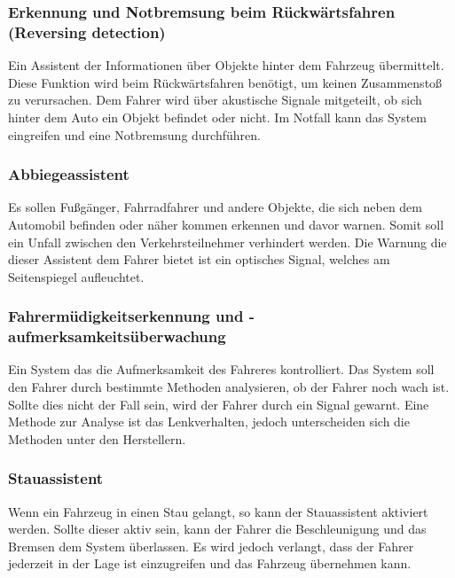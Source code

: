         \subsubsection{Erkennung und Notbremsung beim Rückwärtsfahren (Reversing detection)}
        Ein Assistent der Informationen über Objekte hinter dem Fahrzeug übermittelt. Diese Funktion
        wird beim Rückwärtsfahren benötigt, um keinen Zusammenstoß zu verursachen. Dem Fahrer wird 
        über akustische Signale mitgeteilt, ob sich hinter dem Auto ein Objekt befindet oder nicht.
        Im Notfall kann das System eingreifen und eine Notbremsung durchführen.
        ~\cite{assistenzsysteme.PB2}  ~\cite{reversedetection.PB1}

        \subsubsection{Abbiegeassistent}
        Es sollen Fußgänger, Fahrradfahrer und andere Objekte, die sich neben dem Automobil befinden
        oder näher kommen erkennen und davor warnen. Somit soll ein Unfall zwischen den Verkehrsteilnehmer
        verhindert werden. Die Warnung die dieser Assistent dem Fahrer bietet ist ein optisches Signal,
        welches am Seitenspiegel aufleuchtet.
        ~\cite{assistenzsysteme.PB2} ~\cite{abbiegeassi.PB1} ~\cite{abbiegeassi.PB2}

        \subsubsection{Fahrermüdigkeitserkennung und -aufmerksamkeitsüberwachung}
        Ein System das die Aufmerksamkeit des Fahreres kontrolliert. Das System soll den Fahrer durch
        bestimmte Methoden analysieren, ob der Fahrer noch wach ist. Sollte dies nicht der Fall sein,
        wird der Fahrer durch ein Signal gewarnt. Eine Methode zur Analyse ist das Lenkverhalten, jedoch
        unterscheiden sich die Methoden unter den Herstellern.
        ~\cite{muedigkeitsassi.PB1} ~\cite{assistenzsysteme.PB1}  ~\cite{assistenzsysteme.PB2}
        ~\cite{muedigkeitsassi.PB2}
        
        \subsubsection{Stauassistent}
        Wenn ein Fahrzeug in einen Stau gelangt, so kann der Stauassistent aktiviert werden. Sollte dieser
        aktiv sein, kann der Fahrer die Beschleunigung und das Bremsen dem System überlassen. Es wird
        jedoch verlangt, dass der Fahrer jederzeit in der Lage ist einzugreifen und das Fahrzeug übernehmen
        kann.
        ~\cite{stauassi.PB1} ~\cite{stauassi.PB2}
        
